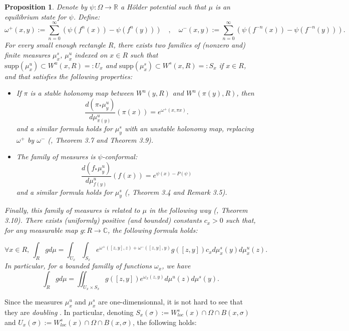 \documentclass[a4paper]{article}
\newtheorem{proposition}[theorem]{Proposition}
\theoremstyle{definition}
\begin{document}
\begin{proposition}\cite{Le00,Cl20}\label{prop:locProdStruct}
Denote by $\psi:\Omega \rightarrow \mathbb{R}$ a Hölder potential such that $\mu$ is an equilibrium state for $\psi$. Define: $$\omega^+(x,y) := \sum_{n=0}^\infty \left( \psi(f^n(x)) - \psi(f^n(y)) \right) \quad , \quad \omega^-(x,y) := \sum_{n=0}^\infty \left( \psi(f^{-n}(x)) - \psi(f^{-n}(y)) \right). $$
For every small enough rectangle $R$, there exists two families of (nonzero and) finite measures $\mu_x^s$, $\mu_x^u$ indexed on $x \in R$ such that $\text{supp} ( \mu_x^u) \subset W^u(x,R) =: U_x$ and $\text{supp} ( \mu_x^s ) \subset W^s(x,R) =: S_x$ if $x \in R$, and that satisfies the following properties: 

\begin{itemize}
    \item If $\pi$ is a stable holonomy map between $W^u(y,R)$ and $W^u(\pi(y),R)$, then
    $$ \frac{d\left(\pi_*\mu_y^u\right)}{d \mu_{\pi(y)}^u}(\pi(x)) = e^{\omega^+(x,\pi x)}.$$
    and a similar formula holds for $\mu_y^s$ with an unstable holonomy map, replacing $\omega^+$ by $\omega^-$ (\cite{Cl20}, Theorem 3.7 and Theorem 3.9).
    \item The family of measures is $\psi$-conformal:
    $$ \frac{ d \left( f_* \mu_y^u \right)}{d \mu_{f(y)}^u}(f(x)) = e^{\psi(x) - P(\psi) } $$
    and a similar formula holds for $\mu^s_y$ (\cite{Cl20}, Theorem 3.4 and Remark 3.5).
\end{itemize}

Finally, this family of measures is related to $\mu$ in the following way (\cite{Cl20}, Theorem 3.10). There exists (uniformly) positive (and bounded) constants $c_x>0$ such that, for any measurable map $g:R \rightarrow \mathbb{C}$, the following formula holds:

$$ \forall x\in R, \ \int_R g d\mu = \int_{U_x} \int_{S_x} e^{\omega^+([z,y],z)+\omega^-([z,y],y)} g([z,y]) c_x d\mu_{x}^s(y) d\mu_{x}^u(z)  .$$
In particular, for a bounded familly of functions $\omega_x$, we have
$$ \int_R g d\mu = \iint_{U_x \times S_x} g([z,y]) e^{\omega_x(z,y)} d\mu^u(z) d\mu^s(y) .$$ 
\end{proposition}

Since the measures $\mu_x^u$ and $\mu_x^s$ are one-dimensionnal, it is not hard to see that they are \emph{doubling} \cite{Le24}. In particular, denoting $S_x(\sigma) := W^s_{loc}(x) \cap \Omega \cap B(x,\sigma)$ and $U_x(\sigma) := W^s_{loc}(x) \cap \Omega \cap B(x,\sigma)$, the following holds:\\
\end{document}
